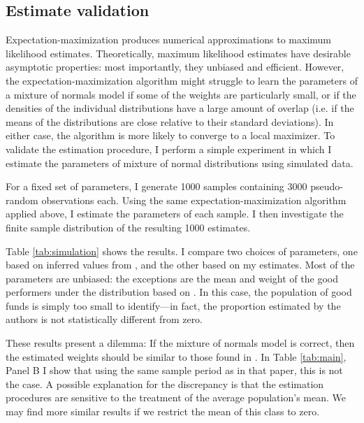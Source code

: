 	\subsection{Estimate validation}
		Expectation-maximization produces numerical approximations to maximum likelihood estimates. Theoretically, maximum likelihood estimates have desirable asymptotic properties: most importantly, they unbiased and efficient.  However, the expectation-maximization algorithm might struggle to learn the parameters of a mixture of normals model if some of the weights are particularly small, or if the densities of the individual distributions have a large amount of overlap (i.e. if the means of the distributions are close relative to their standard deviations). In either case, the algorithm is more likely to converge to a local maximizer. To validate the estimation procedure, I perform a simple experiment in which I estimate the parameters of mixture of normal distributions using simulated data.

		For a fixed set of parameters, I generate 1000 samples containing 3000 pseudo-random observations each. Using the same expectation-maximization algorithm applied above, I estimate the parameters of each sample. I then investigate the finite sample distribution of the resulting 1000 estimates.

		Table \ref{tab:simulation} shows the results. I compare two choices of parameters, one based on inferred values from \citet{Barras2010}, and the other based on my estimates. Most of the parameters are unbiased: the exceptions are the mean and weight of the good performers under the distribution based on \citet{Barras2010}.  In this case, the population of good funds is simply too small to identify---in fact, the proportion estimated by the authors is not statistically different from zero.

		These results present a dilemma: If the mixture of normals model is correct, then the estimated weights should be similar to those found in \citet{Barras2010}. In Table \ref{tab:main}, Panel B I show that using the same sample period as in that paper, this is not the case.  A possible explanation for the discrepancy is that the estimation procedures are sensitive to the treatment of the average population's mean.  We may find more similar results if we restrict the mean of this class to zero.

